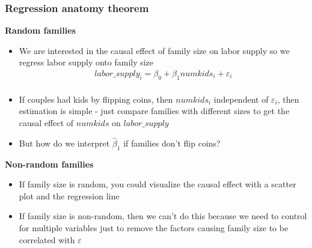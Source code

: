 \documentclass[notes=show]{beamer}
\begin{document}
\subsubsection{Regression anatomy theorem}
\begin{frame}[plain]

	\begin{center}
	\textbf{Random families}
	\end{center}
	
	\begin{itemize}
	\item We are interested in the causal effect of family size on labor supply so we regress labor supply onto family size
		\begin{align*}
		&labor\_supply_i = \beta_0 + \beta_1 numkids_i + \varepsilon_i&\\
		\end{align*}
	\item If couples had kids by flipping coins, then $numkids_i$ independent of $\varepsilon_i$, then estimation is simple - just compare families with different sizes to get the causal effect of $numkids$ on $labor\_supply$
	\item But how do we interpret $\widehat{\beta}_1$ if families don't flip coins?
	\end{itemize}
\end{frame}

\begin{frame}[plain]
\begin{center}
\textbf{Non-random families}
\end{center}

\begin{itemize}

	\item If family size is random, you could visualize the causal effect with a scatter plot and the regression line
	\item If family size is non-random, then we can't do this because we need to control for multiple variables just to remove the factors causing family size to be correlated with $\varepsilon$

\end{itemize}
\end{frame}
\end{document}
